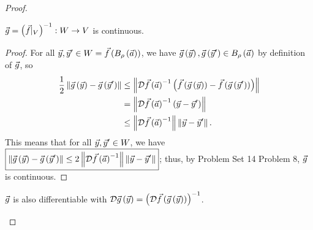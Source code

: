 \documentclass[main.tex]{subfiles}
\begin{document}
\begin{proof}
    \begin{claim}
        $\vec{g} = \left( \vec{f} |_V \right)^{-1} : W \to V$ is continuous.
    \end{claim}

    \begin{proof}
        For all $\vec{y}, \vec{y}'\in W = \vec{f}\left( B_\rho\left( \vec{a} \right) \right)$, we have $\vec{g}\left( \vec{y} \right), \vec{g}\left( \vec{y}' \right)\in B_\rho\left( \vec{a} \right)$ by definition of $\vec{g}$, so
        \begin{align*}
            \frac{1}{2}\left\lVert \vec{g}\left( \vec{y} \right) - \vec{g}\left( \vec{y}' \right) \right\rVert &\le \left\lVert \mathcal{D}\vec{f}\left( \vec{a} \right)^{-1}\left( \vec{f}\left( \vec{g}\left( \vec{y} \right) \right) - \vec{f}\left( \vec{g}\left( \vec{y}' \right) \right) \right) \right\rVert \\
            &= \left\lVert \mathcal{D}\vec{f}\left( \vec{a} \right)^{-1}\left( \vec{y} - \vec{y}' \right) \right\rVert \\
            &\le \left\lVert \mathcal{D}\vec{f}\left( \vec{a} \right)^{-1} \right\rVert\left\lVert \vec{y} - \vec{y}' \right\rVert.
        \end{align*}
        This means that for all $\vec{y}, \vec{y}' \in W$, we have $\boxed{\left\lVert \vec{g}\left( \vec{y} \right) - \vec{g}\left( \vec{y}' \right) \right\rVert \le 2\left\lVert \mathcal{D}\vec{f}\left( \vec{a} \right)^{-1} \right\rVert\left\lVert \vec{y} - \vec{y}' \right\rVert}$; thus, by Problem Set 14 Problem 8, $\vec{g}$ is continuous.
    \end{proof}

    \begin{claim}
        $\vec{g}$ is also differentiable with $\mathcal{D}\vec{g}\left( \vec{y} \right) = \left( \mathcal{D}\vec{f}\left( \vec{g}\left( \vec{y} \right) \right) \right)^{-1}$.
    \end{claim}


\end{proof}
\end{document}
